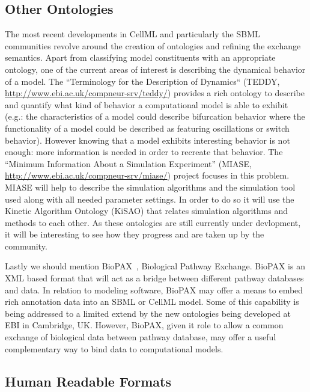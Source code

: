 \documentclass[12pt]{article}
\begin{document}
\subsection{Other Ontologies}

The most recent developments in CellML and particularly the SBML
communities revolve around the creation of ontologies and refining
the exchange semantics. Apart from classifying model constituents
with an appropriate ontology, one of the current areas of interest
is describing the dynamical behavior of a model. The ``Terminology
for the Description of Dynamics`` (TEDDY,
\url{http://www.ebi.ac.uk/compneur-srv/teddy/}) provides a rich
ontology to describe and quantify what kind of behavior a
computational model is able to exhibit (e.g.: the characteristics of
a model could describe bifurcation behavior where the functionality
of a model could be described as featuring oscillations or switch
behavior). However knowing that a model exhibits interesting
behavior is not enough: more information is needed in order to
recreate that behavior. The ``Minimum Information About a Simulation
Experiment'' (MIASE, \url{http://www.ebi.ac.uk/compneur-srv/miase/}) project focuses in
this problem. MIASE will help to describe the simulation algorithms
and the simulation tool used along with all needed parameter
settings. In order to do so it will use the Kinetic Algorithm
Ontology (KiSAO) that relates simulation algorithms and methods to
each other. As these ontologies are still currently under
devlopment, it will be interesting to see how they progress and are
taken up by the community.

Lastly we should mention BioPAX~\citep{BioPax:2007}, Biological Pathway Exchange. BioPAX is an XML based format that will act as a bridge between different
pathway databases and data. In relation to modeling software, BioPAX
may offer a means to embed rich annotation data into an SBML or
CellML model. Some of this capability is being addressed to a
limited extend by the new ontologies being developed at EBI in
Cambridge, UK. However, BioPAX, given it role to allow a common
exchange of biological data between pathway database, may offer a
useful complementary way to bind data to computational models.

\subsection{Human Readable Formats}
\end{document}

